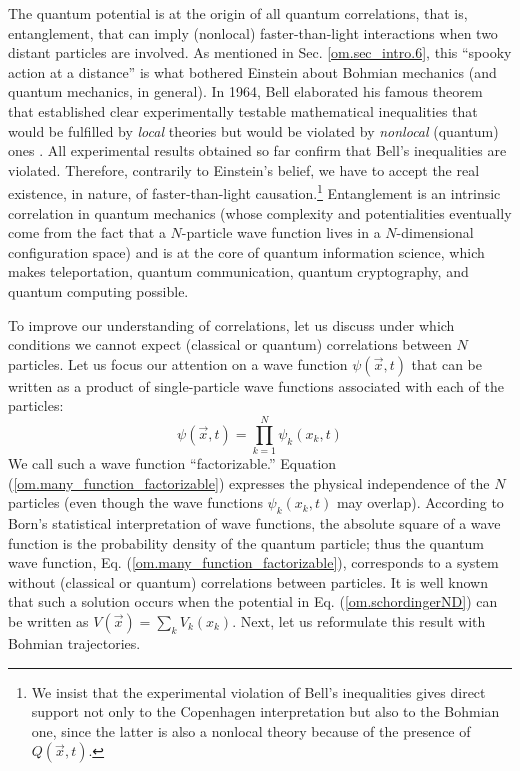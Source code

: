 \documentclass[onecolumn,nofootinbib, secnumarabic, amsmath, nobibnotes,11pt,aps,pra]{revtex4-1}
\newcommand{\sref}[1]{Sec. \ref{#1}}
\newcommand{\eref}[1]{Eq. (\ref{#1})}
\newcommand{\Eref}[1]{Equation (\ref{#1})}
\begin{document}
The quantum potential is at the origin of all quantum correlations,
that is, entanglement, that can imply (nonlocal) faster-than-light
interactions when two distant particles are involved. As mentioned
in \sref{om.sec_intro.6}, this ``spooky action at a distance'' is
what bothered Einstein about Bohmian mechanics (and quantum
mechanics, in general). In 1964, Bell elaborated his famous theorem
that established clear experimentally testable mathematical
inequalities that would be fulfilled by \textit{local} theories but
would be violated by \textit{nonlocal} (quantum) ones
\cite{om.Bell1964}. All experimental results obtained so far confirm
that Bell's inequalities are violated. Therefore, contrarily to
Einstein's belief, we have to accept the real existence, in nature,
of faster-than-light causation.\footnote{We insist that the
experimental violation of Bell's inequalities gives direct support
not only to the Copenhagen interpretation but also to the Bohmian
one, since the latter is also a nonlocal theory because of the presence of
$Q(\vec{x},t)$.} Entanglement is an intrinsic correlation in
quantum mechanics (whose complexity and potentialities eventually
come from the fact that a $N$-particle wave function lives in a
$N$-dimensional configuration space) and is at the core of quantum
information science, which makes teleportation, quantum
communication, quantum cryptography, and quantum computing possible.

To improve our understanding of correlations, let us discuss under
which conditions we cannot expect (classical or quantum)
correlations between $N$ particles. Let us focus our attention on a
wave function $\psi(\vec{x},t)$ that can be written as a product of
single-particle wave functions associated with each of the
particles:
\begin{equation}
\label{om.many_function_factorizable}
\psi(\vec{x},t) = \prod_{k = 1}^N \psi_k(x_k,t)
\end{equation}
We call such a wave function ``factorizable.'' \Eref{om.many_function_factorizable} expresses the physical independence of the $N$ particles (even though the wave functions $\psi_k(x_k,t)$ may overlap). According to Born's statistical interpretation of wave functions, the absolute square of a wave function is the probability density of the quantum particle; thus the quantum wave function, \eref{om.many_function_factorizable}, corresponds to a system without (classical or quantum) correlations between particles. It is well known that such a solution occurs when the potential in \eref{om.schordingerND} can be written as $V(\vec{x}) = \sum_k V_k(x_k)$. Next, let us reformulate this result with Bohmian trajectories.
\end{document}
